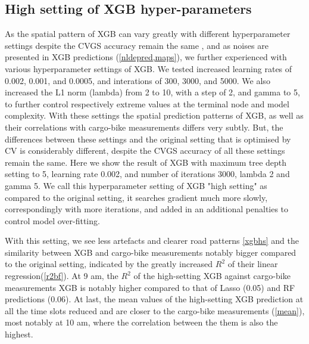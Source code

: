 \documentclass{article}
\begin{document}
\subsection{High setting of XGB hyper-parameters}
As the spatial pattern of XGB can vary greatly with different hyperparameter settings despite the CVGS accuracy remain the same \cite{luglobal}, and as noises are presented in XGB predictions (\cref{nldepred,maps}), we further experienced with various hyperparameter settings of XGB. We tested increased learning rates of 0.002, 0.001, and 0.0005, and interations of 300, 3000, and 5000. We also increased the L1 norm (lambda) from 2 to 10, with a step of 2, and gamma\citep{chen2016xgboost} to 5, to further control respectively extreme values at the terminal node and model complexity. With these settings the spatial prediction patterns of XGB, as well as their correlations with cargo-bike measurements differs very subtly. But, the differences between these settings and the original setting that is optimised by CV is considerably different, despite the CVGS accuracy of all these settings remain the same. Here we show the result of XGB with maximum tree depth setting to 5, learning rate 0.002, and number of iterations 3000, lambda 2 and gamma 5. We call this hyperparameter setting of XGB "high setting" as compared to the original setting, it searches gradient much more slowly, correspondingly with more iterations, and added in an additional penalties to control model over-fitting. 

With this setting, we see less artefacts and clearer road patterns \cref{xgbhs} and the similarity between XGB and cargo-bike measurements notably bigger compared to the original setting, indicated by the greatly increased $R^2$ of their linear regression(\cref{r2bf}). At 9 am, the $R^2$ of the high-setting XGB against cargo-bike measurements XGB is notably higher compared to that of Lasso (0.05) and RF predictions (0.06). At last, the mean values of the high-setting XGB prediction at all the time slots reduced and are closer to the cargo-bike measurements (\cref{mean}), most notably at 10 am, where the correlation between the them is also the highest. 
\end{document}
